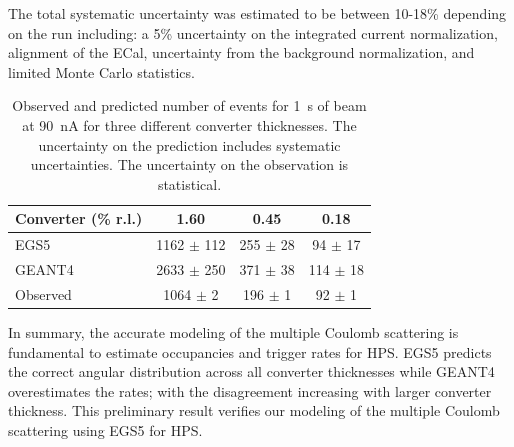 The total systematic uncertainty was estimated to be between 10-18\% depending on the run including:  
a 5\% uncertainty on the integrated current normalization, 
alignment of the ECal, 
uncertainty from the background normalization, 
and limited Monte Carlo statistics.  
\begin{table}
\begin{tabular}{|l|c|c|c|}
\hline
Converter (\% r.l.) & 1.60 & 0.45 &	0.18 \\
\hline
EGS5 &	1162 $\pm$ 112 &	255 $\pm$ 28 &	94 $\pm$ 17	\\
\hline
GEANT4 & 2633 $\pm$ 250 & 	371 $\pm$ 38 &	114 $\pm$ 18 \\
\hline
Observed 	& 1064 $\pm$ 2 & 196 $\pm$ 1 &	92 $\pm$ 1 \\						
%						
\hline
\end{tabular}
\caption{ {\small Observed and predicted number of events for 1~s of beam at 90~nA for three different converter 
thicknesses. The uncertainty on the prediction includes systematic uncertainties. 
The uncertainty on the observation is statistical. }}
\label{tab:ang_distr_dataMC}
\end{table}

In summary, the accurate modeling of the multiple Coulomb scattering is fundamental to estimate occupancies and trigger rates for HPS. EGS5 predicts the correct angular distribution across all converter thicknesses while GEANT4 overestimates the rates; with the disagreement increasing  with larger converter thickness. This preliminary result verifies our modeling of the multiple Coulomb scattering using EGS5 for HPS.
